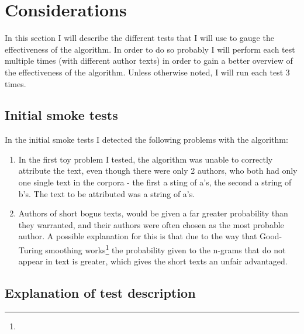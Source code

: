 \section{Considerations}
\label{considerations}

In this section I will describe the different tests that I will use to gauge the effectiveness of the algorithm. In order to do so probably I will perform each test multiple times (with different author texts) in order to gain a better overview of the effectiveness of the algorithm. Unless otherwise noted, I  will run each test 3 times.

\subsection{Initial smoke tests}
\label{smokeTest}
In the initial smoke tests I detected the following problems with the algorithm:
\begin{enumerate}
\item In the first toy problem I tested, the algorithm was unable to correctly attribute the text, even though there were only 2 authors, who both had only one single text in the corpora - the first a sting of a's, the second a string of b's. The text to be attributed was a string of a's.

\item Authors of short bogus texts, would be given a far greater probability than they warranted, and their authors were often chosen as the most probable author. A possible explanation for this is that due to the way that Good-Turing smoothing works\footnote{} the probability given to the n-grams that do not appear in text is greater, which gives the short texts an unfair advantaged. 
\end{enumerate}
 

\subsection{Explanation of test description}

